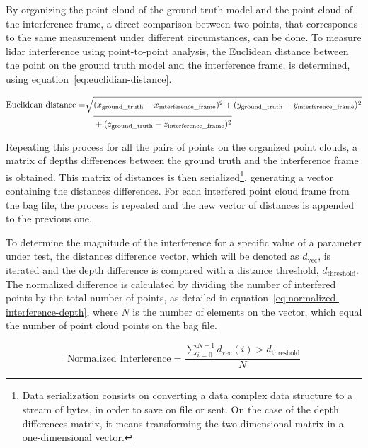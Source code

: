By organizing the point cloud of the ground truth model and the point cloud of the interference frame, a direct comparison between two points, that corresponds to the same measurement under different circumstances, can be done. To measure \ac{lidar} interference using point-to-point analysis, the Euclidean distance between the point on the ground truth model and the interference frame, is determined, using equation~\ref{eq:euclidian-distance}.

\begin{equation}
\label{eq:euclidian-distance}
\begin{split}
\displaystyle
\text{Euclidean distance} = & \sqrt{(x_{\text{ground\_truth}} - x_{\text{interference\_frame}})^2 + (y_{\text{ground\_truth}} - y_{\text{interference\_frame}})^2} \\
														& \displaystyle \quad \overline{\rule{0pt}{2.5ex} + (z_{\text{ground\_truth}} - z_{\text{interference\_frame}})^2 }
\end{split}
\end{equation}

Repeating this process for all the pairs of points on the organized point clouds, a matrix of depths differences between the ground truth and the interference frame is obtained. This matrix of distances is then serialized\footnote{Data serialization consists on converting a data complex data structure to a stream of bytes, in order to save on file or sent. On the case of the depth differences matrix, it means transforming the two-dimensional matrix in a one-dimensional vector.}, generating a vector containing the distances differences. For each interfered point cloud frame from the bag file, the process is repeated and the new vector of distances is appended to the previous one. 

To determine the magnitude of the interference for a specific value of a parameter under test, the distances difference vector, which will be denoted as $d_\text{vec}$, is iterated and the depth difference is compared with a distance threshold, $d_\text{threshold}$. The normalized difference is calculated by dividing the number of interfered points by the total number of points, as detailed in equation~\ref{eq:normalized-interference-depth}, where $N$ is the number of elements on the vector, which equal the number of point cloud points on the bag file.

\begin{equation}
\label{eq:normalized-interference-depth}
\displaystyle
\text{Normalized Interference} = \frac{\sum\limits^{N-1}_{i = 0} d_{\text{vec}}(i)
> d_\text{threshold}}{N}
\end{equation}

